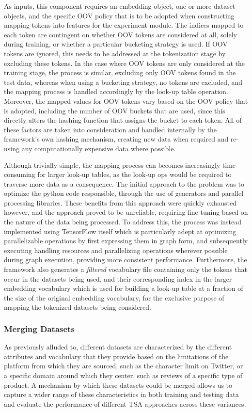 \documentclass[12pt, a4paper]{report}
\theoremstyle{definition}
\theoremstyle{definition}%
\theoremstyle{definition}%
\theoremstyle{definition}%
\theoremstyle{definition}%
\theoremstyle{definition}%
\begin{document}
As inputs, this component requires an embedding object, one or more dataset objects, and the specific OOV policy that is to be adopted when constructing mapping tokens into features for the experiment module. The indices mapped to each token are contingent on whether OOV tokens are considered at all, solely during training, or whether a particular bucketing strategy is used. If OOV tokens are ignored, this needs to be addressed at the tokenization stage by excluding these tokens. In the case where OOV tokens are only considered at the training stage, the process is similar, excluding only OOV tokens found in the test data, whereas when using a bucketing strategy, no tokens are excluded, and the mapping process is handled accordingly by the look-up table operation. Moreover, the mapped values for OOV tokens vary based on the OOV policy that is adopted, including the number of OOV buckets that are used, since this directly alters the hashing function that assigns the bucket to each token. All of these factors are taken into consideration and handled internally by the framework's own hashing mechanism, creating new data when required and re-using any computationally expensive data where possible.

Although trivially simple, the mapping process can becomes increasingly time-consuming for larger look-up tables, as the look-up ops would be required to traverse more data as a consequence. The initial approach to the problem was to optimize the python code responsible, through the use of generators and parallel processing libraries. These benefits from this approach were quickly exhausted however, and the approach proved to be unreliable, requiring fine-tuning based on the nature of the data being processed. To address this, the process was instead implemented using TensorFlow itself which is particularly adept at optimizing parallelizable operations by first expressing them in graph form, and subsequently executing handling resources and parallelizing operations wherever possible during graph execution, providing more consistent performance. Furthermore, the framework also generates a \textit{filtered} vocabulary file containing only the tokens that occur in the datasets being used, and their corresponding index in the larger embedding vocabulary which is used for building a look-up table at a fraction of the size of the original embedding vocabulary, for the exclusive purpose of mapping the tokenized datasets being considered.

\subsubsection{Merging Datasets}
As previously alluded to, different datasets are characterized by the different attributes and vocabulary that they provide based on the limitations of the platform from which they are sourced, such as the character limit on Twitter, or a specific domain around which they center, such as reviews of a specific type of product. A mechanism by which these datasets could be merged allows us to capture a wider range of these characteristics in both training and testing data and evaluate the performance of different TSA approaches across these variances.
\end{document}
